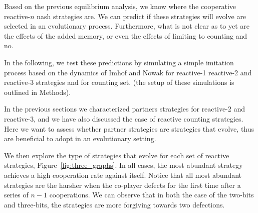 \documentclass{article}
\theoremstyle{definition}
\begin{document}
Based on the previous equilibrium analysis, we know where the cooperative reactive-$n$
nash strategies are. We can predict if these strategies will evolve are selected
in an evolutionary process. Furthermore, what is not clear as to yet are
the effects of the added memory, or even the effects of limiting to counting and
no.

In the following, we test these predictions by simulating a simple imitation
process based on the dynamics of Imhof and Nowak \citep{imhof:royal:2010} for
reactive-1 reactive-2 and reactive-3 strategies and for counting set. (the setup
of these simulations is outlined in Methods).

In the previous sections we
characterized partners strategies for reactive-2 and reactive-3, and we
have also discussed the case of reactive counting strategies. Here we want to
assess whether partner strategies are strategies that evolve, thus are beneficial to
adopt in an evolutionary setting.

We then explore the type of strategies that evolve for each set of reactive
strategies, Figure~\ref{fig:three_graphs}. In all cases, the most abundant
strategy achieves a high cooperation rate against itself. Notice that all most
abundant strategies are the harsher when the co-player defects for the first
time after a series of \(n - 1\) cooperations. We can observe that in both the
case of the two-bits and three-bits, the strategies are more forgiving towards
two defections.
\end{document}
